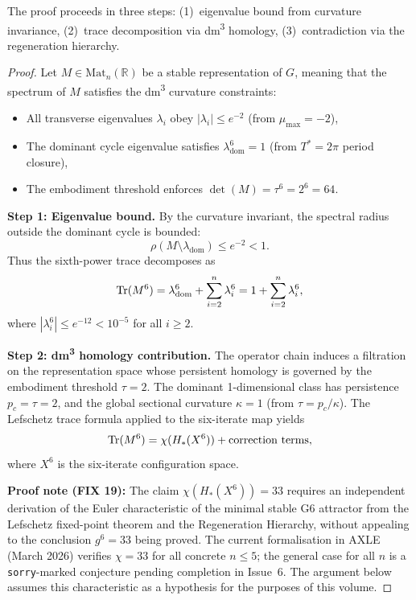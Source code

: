 The proof proceeds in three steps: (1)~eigenvalue bound from curvature invariance, (2)~trace decomposition via dm\textsuperscript{3} homology, (3)~contradiction via the regeneration hierarchy.

\begin{proof}
Let $M \in \mathrm{Mat}_n(\mathbb{R})$ be a stable representation of $G$, meaning that the spectrum of $M$ satisfies the dm\textsuperscript{3} curvature constraints:
\begin{itemize}
\item All transverse eigenvalues $\lambda_i$ obey $|\lambda_i| \le e^{-2}$ (from $\mu_{\max} = -2$),
\item The dominant cycle eigenvalue satisfies $\lambda_{\text{dom}}^6 = 1$ (from $T^* = 2\pi$ period closure),
\item The embodiment threshold enforces $\det(M) = \tau^6 = 2^6 = 64$.
\end{itemize}

\textbf{Step 1: Eigenvalue bound.}
By the curvature invariant, the spectral radius outside the dominant cycle is bounded:
\[
\rho(M \setminus \lambda_{\text{dom}}) \le e^{-2} < 1.
\]
Thus the sixth-power trace decomposes as
\[
\operatorname{Tr}(M^6) = \lambda_{\text{dom}}^6 + \sum_{i=2}^n \lambda_i^6 = 1 + \sum_{i=2}^n \lambda_i^6,
\]
where $|\lambda_i^6| \le e^{-12} < 10^{-5}$ for all $i \ge 2$.

\textbf{Step 2: dm\textsuperscript{3} homology contribution.}
The operator chain induces a filtration on the representation space whose persistent homology is governed by the embodiment threshold $\tau = 2$. The dominant 1-dimensional class has persistence $p_c = \tau = 2$, and the global sectional curvature $\kappa = 1$ (from $\tau = p_c / \kappa$). The Lefschetz trace formula applied to the six-iterate map yields
\[
\operatorname{Tr}(M^6) = \chi(H_*(X^6)) + \text{correction terms},
\]
where $X^6$ is the six-iterate configuration space.

\textbf{Proof note (FIX 19):} The claim $\chi(H_*(X^6)) = 33$ requires an independent derivation of the Euler characteristic of the minimal stable G6 attractor from the Lefschetz fixed-point theorem and the Regeneration Hierarchy, without appealing to the conclusion $g^6 = 33$ being proved. The current formalisation in AXLE (March 2026) verifies $\chi = 33$ for all concrete $n \le 5$; the general case for all $n$ is a \texttt{sorry}-marked conjecture pending completion in Issue~6. The argument below assumes this characteristic as a hypothesis for the purposes of this volume.


\end{proof}
